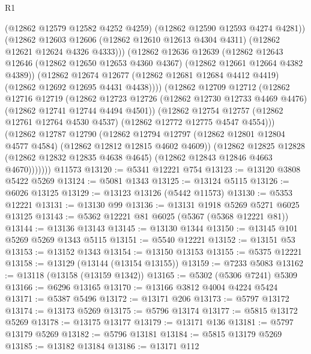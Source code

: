 \begin{lexlean}{R1}
\begin{coremodule}
                (@12862 @12579 @12582 @4252 @4259)
                (@12862 @12590 @12593 @4274 @4281))
              (@12862
                @12603
                @12606
                (@12862 @12610 @12613 @4304 @4311)
                (@12862 @12621 @12624 @4326 @4333)))
            (@12862
              @12636
              @12639
              (@12862
                @12643
                @12646
                (@12862 @12650 @12653 @4360 @4367)
                (@12862 @12661 @12664 @4382 @4389))
              (@12862
                @12674
                @12677
                (@12862 @12681 @12684 @4412 @4419)
                (@12862 @12692 @12695 @4431 @4438))))
          (@12862
            @12709
            @12712
            (@12862
              @12716
              @12719
              (@12862
                @12723
                @12726
                (@12862 @12730 @12733 @4469 @4476)
                (@12862 @12741 @12744 @4494 @4501))
              (@12862
                @12754
                @12757
                (@12862 @12761 @12764 @4530 @4537)
                (@12862 @12772 @12775 @4547 @4554)))
            (@12862
              @12787
              @12790
              (@12862
                @12794
                @12797
                (@12862 @12801 @12804 @4577 @4584)
                (@12862 @12812 @12815 @4602 @4609))
              (@12862
                @12825
                @12828
                (@12862 @12832 @12835 @4638 @4645)
                (@12862 @12843 @12846 @4663 @4670)))))))
    @11573
@13120 := @5341 @12221 @754
@13123 := @13120 @3808 @5422 @5269
@13124 := @5081 @1343
@13125 := @13124 @5115
@13126 := @6026 @13125
@13129 := @13123 @13126 (@5442 @11573)
@13130 := @5353 @12221
@13131 := @13130 @99
@13136 := @13131 @1918 @5269 @5271 @6025 @13125
@13143 := @5362 @12221 @81 @6025 (@5367 (@5368 @12221 @81))
@13144 := @13136 @13143
@13145 := @13130 @1344
@13150 := @13145 @101 @5269 @5269 @1343 @5115
@13151 := @5540 @12221
@13152 := @13151 @53
@13153 := @13152 @1343
@13154 := @13150 @13153
@13155 := @5375 @12221
@13158 := @13129 (@13144 (@13154 @13155))
@13159 := @7233 @5083
@13162 := @13118 (@13158 (@13159 @1342))
@13165 := @5302 (@5306 @7241) @5309
@13166 := @6296 @13165
@13170 := @13166 @3812 @4004 @4224 @5424
@13171 := @5387 @5496
@13172 := @13171 @206
@13173 := @5797 @13172
@13174 := @13173 @5269
@13175 := @5796 @13174
@13177 := @5815 @13172 @5269
@13178 := @13175 @13177
@13179 := @13171 @136
@13181 := @5797 @13179 @5269
@13182 := @5796 @13181
@13184 := @5815 @13179 @5269
@13185 := @13182 @13184
@13186 := @13171 @112

\end{coremodule}
\end{lexlean}
